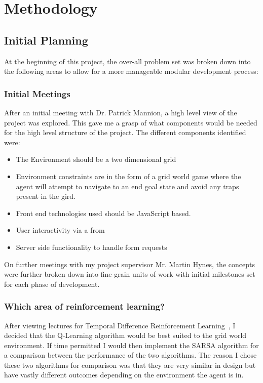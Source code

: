 \chapter{Methodology}
\section{Initial Planning}
At the beginning of this project, the over-all problem set was broken down into the following areas to allow for a more manageable modular development process:

\subsection {Initial Meetings}
After an initial meeting with Dr. Patrick Mannion, a high level view of the project was explored. This gave me a grasp of what components would be needed for the high level structure of the project.
The different components identified were:
\begin{itemize}
	\item The Environment should be a two dimensional grid 
	\item Environment constraints are in the form of a grid world game where the agent will attempt to navigate to an end goal state and avoid any traps present in the gird.
	\item Front end technologies used should be JavaScript based.
	\item User interactivity via a from 
	\item Server side functionality to handle form requests
\end{itemize}

On further meetings with my project supervisor Mr. Martin Hynes, the concepts were further broken down into fine grain units of work with initial milestones set for each phase of development.
\subsection {Which area of reinforcement learning?}
After viewing lectures for Temporal Difference Reinforcement Learning~\cite{Udemy:online}, I decided that the Q-Learning algorithm would be best suited to the grid world environment. If time permitted I would then implement the SARSA algorithm for a comparison between the performance of the two algorithms.
The reason I chose these two algorithms for comparison was that they are very similar in design but have vastly different outcomes depending on the environment the agent is in. 

